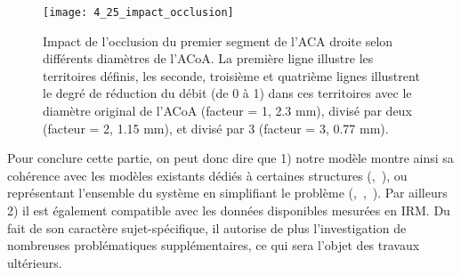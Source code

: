 \begin{figure}[!t]
\centering
\texttt{[image: 4\_25\_impact\_occlusion]}
\caption{ Impact de l'occlusion du premier segment de l'ACA droite selon différents diamètres de l'ACoA. La première ligne
illustre les territoires définis, les seconde, troisième et quatrième lignes illustrent le degré de réduction du débit (de 0 à 1)
dans ces territoires avec le diamètre original de l’ACoA (facteur = 1, 2.3 mm), divisé par deux (facteur = 2, 1.15 mm), et divisé
par 3 (facteur = 3, 0.77 mm).}
\label{fig:4_25_impact_occlusion}	
\end{figure}
Pour conclure cette partie, on peut donc dire que 1) notre modèle montre ainsi sa cohérence
avec les modèles existants dédiés à certaines structures (\cite{Cebral2003},~\cite{Cassot1995}), ou représentant l’ensemble du
système en simplifiant le problème (\cite{Zagzoule1986},~\cite{Linninger2009},~\cite{Kim2007}). Par ailleurs 2) il est également compatible avec les
données disponibles mesurées en IRM. Du fait de son caractère sujet-spécifique, il autorise de plus
l’investigation de nombreuses problématiques supplémentaires, ce qui sera l’objet des travaux
ultérieurs.


{}
